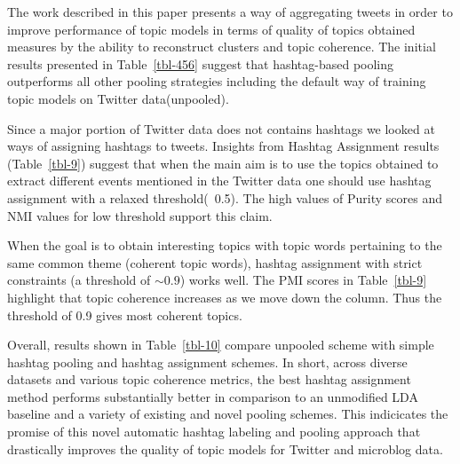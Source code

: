 \documentclass[10pt,a5paper,twoside]{article}
\begin{document}
\label{sec:conclusion}

The work described in this paper presents a way of aggregating tweets
in order to improve performance of topic models in terms of quality of
topics obtained measures by the ability to reconstruct clusters and
topic coherence. The initial results presented in Table~\ref{tbl-456}
suggest that hashtag-based pooling outperforms all other pooling
strategies including the default way of training topic models on
Twitter data(unpooled).

Since a major portion of Twitter data does not contains hashtags we
looked at ways of assigning hashtags to tweets. Insights from Hashtag
Assignment results (Table~\ref{tbl-9}) suggest that when the main aim
is to use the topics obtained to extract different events mentioned in
the Twitter data one should use hashtag assignment with a relaxed
threshold(~0.5). The high values of Purity scores and NMI values for
low threshold support this claim.

When the goal is to obtain interesting topics with topic words
pertaining to the same common theme (coherent topic words), hashtag
assignment with strict constraints (a threshold of $\sim 0.9$) works
well. The PMI scores in Table~\ref{tbl-9} highlight that topic
coherence increases as we move down the column. Thus the threshold of
0.9 gives most coherent topics.

Overall, results shown in Table~\ref{tbl-10} compare unpooled scheme
with simple hashtag pooling and hashtag assignment schemes.  In short,
across diverse datasets and various topic coherence metrics, the best
hashtag assignment method performs substantially better in comparison
to an unmodified LDA baseline and a variety of existing and novel
pooling schemes.  This indicicates the promise of this novel automatic
hashtag labeling and pooling approach that drastically improves the
quality of topic models for Twitter and microblog data.


\end{document}
